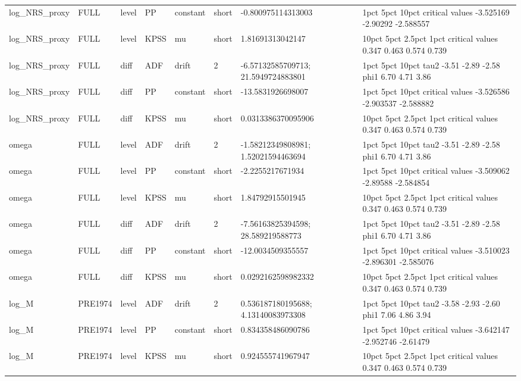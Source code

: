 \begin{tabular}{llllllll}
log\_NRS\_proxy & FULL & level & PP & constant & short & -0.800975114313003 &                      1pct     5pct     10pct critical values -3.525169 -2.90292 -2.588557 \\
log\_NRS\_proxy & FULL & level & KPSS & mu & short & 1.81691313042147 &                 10pct  5pct 2.5pct  1pct critical values 0.347 0.463  0.574 0.739 \\
log\_NRS\_proxy & FULL & diff & ADF & drift & 2 & -6.57132585709713; 21.5949724883801 &       1pct  5pct 10pct tau2 -3.51 -2.89 -2.58 phi1  6.70  4.71  3.86 \\
log\_NRS\_proxy & FULL & diff & PP & constant & short & -13.5831926698007 &                      1pct      5pct     10pct critical values -3.526586 -2.903537 -2.588882 \\
log\_NRS\_proxy & FULL & diff & KPSS & mu & short & 0.0313386370095906 &                 10pct  5pct 2.5pct  1pct critical values 0.347 0.463  0.574 0.739 \\
omega & FULL & level & ADF & drift & 2 & -1.58212349808981; 1.52021594463694 &       1pct  5pct 10pct tau2 -3.51 -2.89 -2.58 phi1  6.70  4.71  3.86 \\
omega & FULL & level & PP & constant & short & -2.2255217671934 &                      1pct     5pct     10pct critical values -3.509062 -2.89588 -2.584854 \\
omega & FULL & level & KPSS & mu & short & 1.84792915501945 &                 10pct  5pct 2.5pct  1pct critical values 0.347 0.463  0.574 0.739 \\
omega & FULL & diff & ADF & drift & 2 & -7.56163825394598; 28.589219588773 &       1pct  5pct 10pct tau2 -3.51 -2.89 -2.58 phi1  6.70  4.71  3.86 \\
omega & FULL & diff & PP & constant & short & -12.0034509355557 &                      1pct      5pct     10pct critical values -3.510023 -2.896301 -2.585076 \\
omega & FULL & diff & KPSS & mu & short & 0.0292162598982332 &                 10pct  5pct 2.5pct  1pct critical values 0.347 0.463  0.574 0.739 \\
log\_M & PRE1974 & level & ADF & drift & 2 & 0.536187180195688; 4.13140083973308 &       1pct  5pct 10pct tau2 -3.58 -2.93 -2.60 phi1  7.06  4.86  3.94 \\
log\_M & PRE1974 & level & PP & constant & short & 0.834358486090786 &                      1pct      5pct    10pct critical values -3.642147 -2.952746 -2.61479 \\
log\_M & PRE1974 & level & KPSS & mu & short & 0.924555741967947 &                 10pct  5pct 2.5pct  1pct critical values 0.347 0.463  0.574 0.739 \\

\end{tabular}
